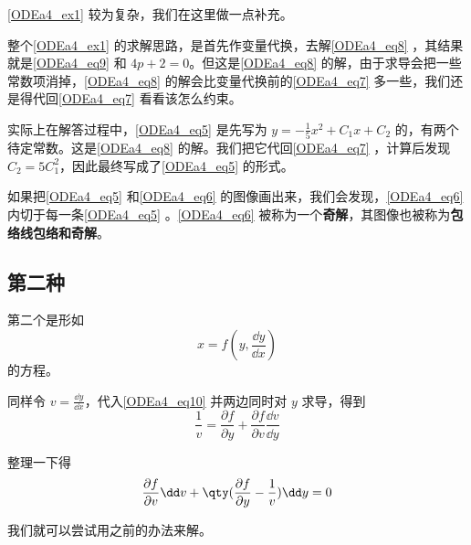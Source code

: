 \autoref{ODEa4_ex1} 较为复杂，我们在这里做一点补充。

整个\autoref{ODEa4_ex1} 的求解思路，是首先作变量代换，去解\autoref{ODEa4_eq8} ，其结果就是\autoref{ODEa4_eq9} 和 $4p+2=0$。但这是\autoref{ODEa4_eq8} 的解，由于求导会把一些常数项消掉，\autoref{ODEa4_eq8} 的解会比变量代换前的\autoref{ODEa4_eq7} 多一些，我们还是得代回\autoref{ODEa4_eq7} 看看该怎么约束。

实际上在解答过程中，\autoref{ODEa4_eq5} 是先写为 $y=-\frac{1}{5}x^2+C_1x+C_2$ 的，有两个待定常数。这是\autoref{ODEa4_eq8} 的解。我们把它代回\autoref{ODEa4_eq7} ，计算后发现 $C_2=5C_1^2$，因此最终写成了\autoref{ODEa4_eq5} 的形式。

如果把\autoref{ODEa4_eq5} 和\autoref{ODEa4_eq6} 的图像画出来，我们会发现，\autoref{ODEa4_eq6} 内切于每一条\autoref{ODEa4_eq5} 
。\autoref{ODEa4_eq6} 被称为一个\textbf{奇解}，其图像也被称为\textbf{包络线包络和奇解}。








\subsection{第二种}

第二个是形如
\begin{equation}\label{ODEa4_eq10}
x=f(y, \frac{\dd y}{\dd x})
\end{equation}
的方程。

同样令 $v=\frac{\dd y}{\dd x}$，代入\autoref{ODEa4_eq10} 并两边同时对 $y$ 求导，得到
\begin{equation}
\frac{1}{v}=\frac{\partial f}{\partial y}+\frac{\partial f}{\partial v}\frac{\dd v}{\dd y}
\end{equation}

整理一下得
\begin{equation}\label{ODEa4_eq13}
\frac{\partial f}{\partial v}\dd v +\qty(\frac{\partial f}{\partial y}-\frac{1}{v})\dd y=0
\end{equation}

我们就可以尝试用之前的办法来解。

